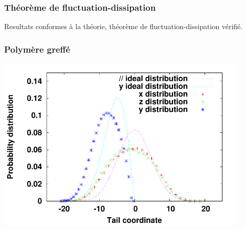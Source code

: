 \documentclass{beamer}
\begin{document}
\frame
{\frametitle{Théorème de fluctuation-dissipation}



{\centering
{}\par
}
\begin{center}
Resultats conformes à la théorie, théorème de fluctuation-dissipation vérifié.
\end{center}

}

\frame
{\frametitle{Polymère greffé}
\begin{center}
\includegraphics[width=0.9\textwidth]{probdistribution.pdf}

\end{center}

}
\end{document}
